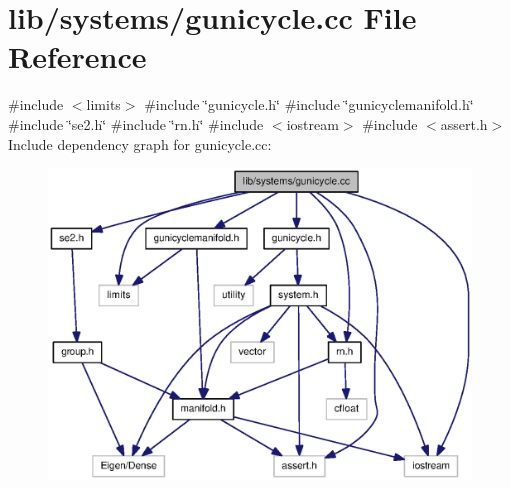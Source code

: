 \section{lib/systems/gunicycle.cc \-File \-Reference}
\label{gunicycle_8cc}
{\ttfamily \#include $<$limits$>$}\*
{\ttfamily \#include \char`\"{}gunicycle.\-h\char`\"{}}\*
{\ttfamily \#include \char`\"{}gunicyclemanifold.\-h\char`\"{}}\*
{\ttfamily \#include \char`\"{}se2.\-h\char`\"{}}\*
{\ttfamily \#include \char`\"{}rn.\-h\char`\"{}}\*
{\ttfamily \#include $<$iostream$>$}\*
{\ttfamily \#include $<$assert.\-h$>$}\*
\-Include dependency graph for gunicycle.\-cc\-:
\nopagebreak
\begin{figure}[H]
\begin{center}
\leavevmode
\includegraphics[width=350pt]{gunicycle_8cc__incl}
\end{center}
\end{figure}
